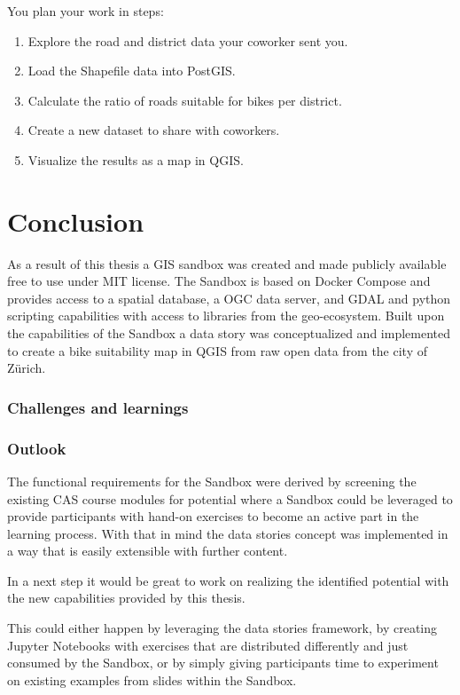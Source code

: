 \documentclass[11pt, a4paper, oneside, parskip=full-]{scrartcl}
\begin{document}
You plan your work in steps:
\begin{enumerate}
  \item Explore the road and district data your coworker sent you.
  \item Load the Shapefile data into PostGIS.
  \item Calculate the ratio of roads suitable for bikes per district.
  \item Create a new dataset to share with coworkers.
  \item Visualize the results as a map in QGIS.
\end{enumerate}

\section{Conclusion}
As a result of this thesis a GIS sandbox was created and made publicly available
free to use under MIT license\cite{osgeostacksandbox}. The Sandbox is based on
Docker Compose and provides access to a spatial database, a OGC data server, and
GDAL and python scripting capabilities with access to libraries from the
geo-ecosystem. Built upon the capabilities of the Sandbox a data story was
conceptualized and implemented to create a bike suitability map in QGIS from raw
open data from the city of Zürich.

\subsubsection*{Challenges and learnings}


\subsubsection*{Outlook}
The functional requirements for the Sandbox were derived by screening the
existing CAS course modules for potential where a Sandbox could be leveraged to
provide participants with hand-on exercises to become an active part in the
learning process. With that in mind the data stories concept was implemented in
a way that is easily extensible with further content.

In a next step it would be great to work on realizing the identified potential
with the new capabilities provided by this thesis.

This could either happen by leveraging the data stories framework, by creating
Jupyter Notebooks with exercises that are distributed differently and just
consumed by the Sandbox, or by simply giving participants time to experiment on
existing examples from slides within the Sandbox.

\printbibliography
\end{document}
